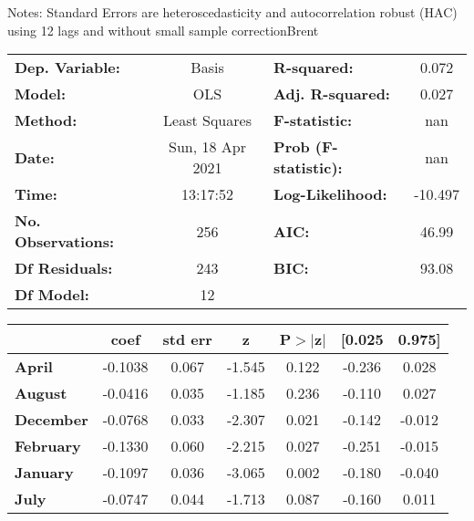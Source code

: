 Notes: \newline
 [1] Standard Errors are heteroscedasticity and autocorrelation robust (HAC) using 12 lags and without small sample correctionBrent\begin{center}
\begin{tabular}{lclc}
\toprule
\textbf{Dep. Variable:}    &      Basis       & \textbf{  R-squared:         } &     0.072   \\
\textbf{Model:}            &       OLS        & \textbf{  Adj. R-squared:    } &     0.027   \\
\textbf{Method:}           &  Least Squares   & \textbf{  F-statistic:       } &       nan   \\
\textbf{Date:}             & Sun, 18 Apr 2021 & \textbf{  Prob (F-statistic):} &      nan    \\
\textbf{Time:}             &     13:17:52     & \textbf{  Log-Likelihood:    } &   -10.497   \\
\textbf{No. Observations:} &         256      & \textbf{  AIC:               } &     46.99   \\
\textbf{Df Residuals:}     &         243      & \textbf{  BIC:               } &     93.08   \\
\textbf{Df Model:}         &          12      & \textbf{                     } &             \\
\bottomrule
\end{tabular}
\begin{tabular}{lcccccc}
                   & \textbf{coef} & \textbf{std err} & \textbf{z} & \textbf{P$> |$z$|$} & \textbf{[0.025} & \textbf{0.975]}  \\
\midrule
\textbf{April}     &      -0.1038  &        0.067     &    -1.545  &         0.122        &       -0.236    &        0.028     \\
\textbf{August}    &      -0.0416  &        0.035     &    -1.185  &         0.236        &       -0.110    &        0.027     \\
\textbf{December}  &      -0.0768  &        0.033     &    -2.307  &         0.021        &       -0.142    &       -0.012     \\
\textbf{February}  &      -0.1330  &        0.060     &    -2.215  &         0.027        &       -0.251    &       -0.015     \\
\textbf{January}   &      -0.1097  &        0.036     &    -3.065  &         0.002        &       -0.180    &       -0.040     \\
\textbf{July}      &      -0.0747  &        0.044     &    -1.713  &         0.087        &       -0.160    &        0.011     \\

\end{tabular}
\end{center}
